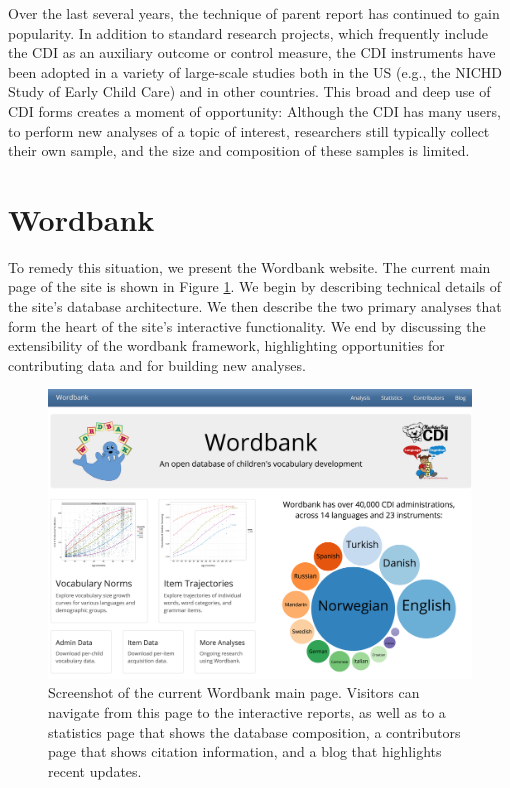 \documentclass[man,noapacite]{apa2}
\begin{document}
Over the last several years, the technique of parent report has continued to gain popularity. In addition to standard research projects, which frequently include the CDI as an auxiliary outcome or control measure, the CDI instruments have been adopted in a variety of large-scale studies both in the US (e.g., the NICHD Study of Early Child Care) and in other countries. This broad and deep use of CDI forms creates a moment of opportunity: Although the CDI has many users, to perform new analyses of a topic of interest, researchers still typically collect their own sample, and the size and composition of these samples is limited.

\section{Wordbank}

To remedy this situation, we present the Wordbank website. The current main page of the site is shown in Figure \ref{fig:screenshot}. We begin by describing technical details of the site's database architecture. We then describe the two primary analyses that form the heart of the site's interactive functionality. We end by discussing the extensibility of the wordbank framework, highlighting opportunities for contributing data and for building new analyses. 

\begin{figure}[h!]
\includegraphics[width=6.4in]{figures/screenshot.png}
\caption{\label{fig:screenshot} Screenshot of the current Wordbank main page. Visitors can navigate from this page to the interactive reports, as well as to a statistics page that shows the database composition, a contributors page that shows citation information, and a blog that highlights recent updates.}
\end{figure}
\end{document}
